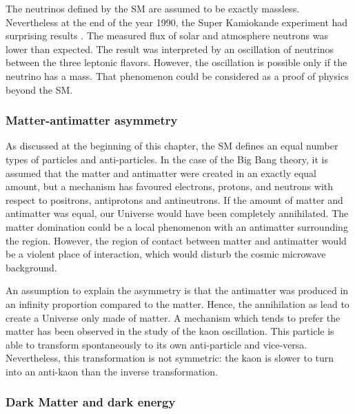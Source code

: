       The neutrinos defined by the \gls{SM} are assumed to be exactly massless.
      Nevertheless at the end of the year 1990, the Super Kamiokande experiment had surprising results \cite{Super-Kamiokande-Oscillation}.
      The measured flux of solar and atmosphere neutrons was lower than expected.
      The result was interpreted by an oscillation of neutrinos between the three leptonic flavors.
      However, the oscillation is possible only if the neutrino has a mass.
      That phenomenon could be considered as a proof of physics beyond the \gls{SM}.

      \subsubsection{Matter-antimatter asymmetry}

      As discussed at the beginning of this chapter, the \gls{SM} defines an equal number types of particles and anti-particles. 
      In the case of the Big Bang theory, it is assumed that the matter and antimatter were created in an exactly equal amount, but a mechanism has favoured electrons, protons, and neutrons with respect to positrons, antiprotons and antineutrons.
      If the amount of matter and antimatter was equal, our Universe would have been completely annihilated.
      The matter domination could be a local phenomenon with an antimatter surrounding the region. 
      However, the region of contact between matter and antimatter would be a violent place of interaction, which would disturb the cosmic microwave background.

      An assumption to explain the asymmetry is that the antimatter was produced in an infinity proportion compared to the matter.
      Hence, the annihilation as lead to create a Universe only made of matter.
      A mechanism which tends to prefer the matter has been observed in the study of the kaon oscillation.
      This particle is able to transform spontaneously to its own anti-particle and vice-versa.
      Nevertheless, this transformation is not symmetric: the kaon is slower to turn into an anti-kaon than the inverse transformation.
 
      \subsubsection{Dark Matter and dark energy}
      

